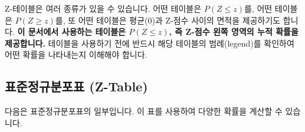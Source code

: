 \documentclass[11pt,a4paper]{book}
\theoremstyle{definition}
\begin{document}
\begin{warningbox}[title=\textbf{Z-테이블 사용 시 주의사항}]
Z-테이블은 여러 종류가 있을 수 있습니다. 어떤 테이블은 $P(Z \le z)$를, 어떤 테이블은 $P(Z \ge z)$를, 또 어떤 테이블은 평균(0)과 Z-점수 사이의 면적을 제공하기도 합니다. \textbf{이 문서에서 사용하는 테이블은 $P(Z \le z)$, 즉 Z-점수 왼쪽 영역의 누적 확률을 제공합니다.} 테이블을 사용하기 전에 반드시 해당 테이블의 범례(legend)를 확인하여 어떤 확률을 나타내는지 이해해야 합니다.
\end{warningbox}

\subsection{표준정규분포표 (Z-Table)}
다음은 표준정규분포표의 일부입니다. 이 표를 사용하여 다양한 확률을 계산할 수 있습니다.
\end{document}
